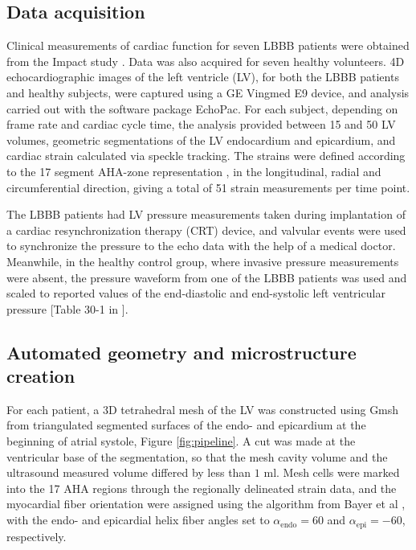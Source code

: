 \documentclass[times]{elsarticle}
\begin{document}
\subsection{Data acquisition}
\label{sec:clinical_data}

Clinical measurements of cardiac function for seven LBBB patients were
obtained from the Impact study \cite{ImpactStudy2016}.
Data was also acquired for seven healthy volunteers. 4D echocardiographic
images of the left ventricle (LV), for both the LBBB patients and
healthy subjects, were captured using
a GE Vingmed E9 device, and analysis carried out with the
software package EchoPac. For each subject, depending on frame rate and cardiac cycle time, the
analysis provided between 15 and 50 LV volumes,  geometric segmentations of the LV
endocardium and epicardium, and cardiac strain calculated via speckle
tracking. The strains were defined according to
the 17 segment AHA-zone representation
\cite{cerqueira2002standardized}, in the longitudinal, radial and
circumferential direction, giving a total of 51 strain measurements
per time point.

The LBBB patients had LV pressure measurements taken during
implantation of a cardiac resynchronization therapy (CRT) device, and
valvular events were used to synchronize the pressure to the echo data
with the help of a medical doctor.  Meanwhile, in the 
healthy control group, where invasive pressure measurements were
absent, the pressure waveform from one of the LBBB patients was used and
scaled to reported values of the end-diastolic and end-systolic
left ventricular pressure [Table 30-1 in \cite{klingensmith2008washington}].


\subsection{Automated geometry and microstructure creation}
For each patient, a 3D tetrahedral mesh of the LV was
constructed using Gmsh \cite{geuzaine2009gmsh} from triangulated
segmented surfaces of the endo- and epicardium at the beginning of
atrial systole, Figure \ref{fig:pipeline}. A cut was made at the
ventricular base of the segmentation, so that the mesh cavity volume
and the ultrasound measured volume differed by less than  $1$ ml. Mesh
cells were marked into the 17 AHA regions through the regionally
delineated strain data, and the myocardial fiber orientation were
assigned using the algorithm from Bayer et al \cite{bayer2012novel},
with the endo- and epicardial helix fiber angles set to
$\alpha_{\text{endo}} = 60$ and $\alpha_{\text{epi}} = -60$, respectively.
\end{document}
